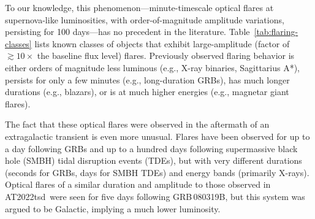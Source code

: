 \documentclass{nature_plusfigure}
\newcommand{\at}{AT2022tsd}
\begin{document}
To our knowledge, this phenomenon---minute-timescale optical flares at supernova-like luminosities, with order-of-magnitude amplitude variations, persisting for 100 days---has no precedent in the literature.
 Table~\ref{tab:flaring-classes} lists known classes of objects that exhibit large-amplitude (factor of $\gtrsim10\times$ the baseline flux level) flares. Previously observed flaring behavior is either orders of magnitude less luminous (e.g., X-ray binaries\cite{Fender1997}, Sagittarius A*\cite{Marrone2008}), persists for only a few minutes (e.g., long-duration GRBs\cite{Racusin2008}), has much longer durations (e.g., blazars\cite{Nesci2021}), or is at much higher energies (e.g., magnetar giant flares\cite{Hurley1999}).
 
The fact that these optical flares were observed in the aftermath of an extragalactic transient is even more unusual.
Flares have been observed for up to a day following GRBs\cite{Kumar2015} and up to a hundred days following supermassive black hole (SMBH) tidal disruption events (TDEs\cite{Mangano2016,vanVelzen2021}), but with very different durations (seconds for GRBs, days for SMBH TDEs) and energy bands (primarily X-rays). Optical flares of a similar duration and amplitude to those observed in \at\ were seen for five days following GRB\,080319B, but this system was argued to be Galactic\cite{Kasliwal2008,CastroTirado2008,Stefanescu2008}, implying a much lower luminosity.
\end{document}
